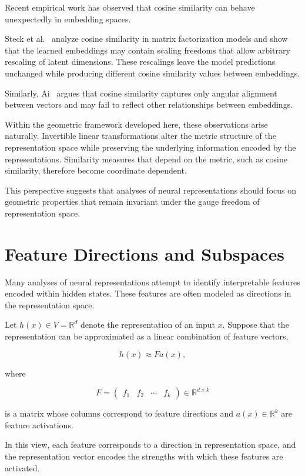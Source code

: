 \documentclass[11pt]{article}
\begin{document}
Recent empirical work has observed that cosine similarity can behave
unexpectedly in embedding spaces.

Steck et al.~\cite{Steck2024} analyze cosine similarity in matrix
factorization models and show that the learned embeddings may contain
scaling freedoms that allow arbitrary rescaling of latent dimensions.
These rescalings leave the model predictions unchanged while producing
different cosine similarity values between embeddings.

Similarly, Ai~\cite{Ai2026} argues that cosine similarity captures only
angular alignment between vectors and may fail to reflect other
relationships between embeddings.

Within the geometric framework developed here, these observations arise
naturally.
Invertible linear transformations alter the metric structure of the
representation space while preserving the underlying information encoded
by the representations.
Similarity measures that depend on the metric, such as cosine similarity,
therefore become coordinate dependent.

This perspective suggests that analyses of neural representations should
focus on geometric properties that remain invariant under the gauge
freedom of representation space.

\section{Feature Directions and Subspaces}

Many analyses of neural representations attempt to identify interpretable
features encoded within hidden states.  These features are often modeled as
directions in the representation space.

Let $h(x) \in V = \mathbb{R}^d$ denote the representation of an input $x$.
Suppose that the representation can be approximated as a linear combination
of feature vectors,

\[
h(x) \approx F a(x),
\]

where

\[
F =
\begin{pmatrix}
f_1 & f_2 & \cdots & f_k
\end{pmatrix}
\in \mathbb{R}^{d \times k}
\]

is a matrix whose columns correspond to feature directions and
$a(x) \in \mathbb{R}^k$ are feature activations.

In this view, each feature corresponds to a direction in representation
space, and the representation vector encodes the strengths with which
these features are activated.
\end{document}
